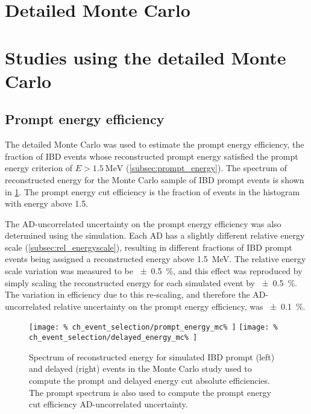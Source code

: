 \section{Detailed Monte Carlo}
\label{sec:thu_toymc}

\section{Studies using the detailed Monte Carlo}
\label{sec:thu_toymc_studies}

\subsection{Prompt energy efficiency}
\label{subsec:thu_toymc_prompt}

The detailed Monte Carlo was used to estimate the prompt energy efficiency,
the fraction of IBD events whose reconstructed prompt energy
satisfied the prompt energy criterion of $E > \SI{1.5}{\MeV}$
(\cref{subsec:prompt_energy}).
The spectrum of reconstructed energy for the Monte Carlo sample of IBD prompt events
is shown in \cref{fig:prompt_eff_mc}.
The prompt energy cut efficiency is the fraction of events in the histogram
with energy above \SI{1.5}{\mev}.

The AD-uncorrelated uncertainty on the prompt energy efficiency
was also determined using the simulation.
Each AD has a slightly different relative energy scale (\cref{subsec:rel_energyscale}),
resulting in different fractions of IBD prompt events
being assigned a reconstructed energy above \SI{1.5}{\MeV}.
The relative energy scale variation was measured to be \SI{+-0.5}{\percent},
and this effect was reproduced by simply
scaling the reconstructed energy for each simulated event by \SI{+-0.5}{\percent}.
The variation in efficiency due to this re-scaling,
and therefore the AD-uncorrelated relative uncertainty on the prompt energy efficiency,
was \SI{+-0.1}{\percent}.

\begin{figure}
    \centering
    \texttt{[image: \%
        ch\_event\_selection/prompt\_energy\_mc\%
    ]}
    \texttt{[image: \%
        ch\_event\_selection/delayed\_energy\_mc\%
    ]}
    \caption{Spectrum of reconstructed energy for simulated IBD prompt (left)
        and delayed (right) events
        in the Monte Carlo study used to compute the prompt and delayed
        energy cut absolute efficiencies.
        The prompt spectrum is also used to compute the prompt energy cut
    efficiency AD-uncorrelated uncertainty.}
    \label{fig:prompt_eff_mc}
\end{figure}

